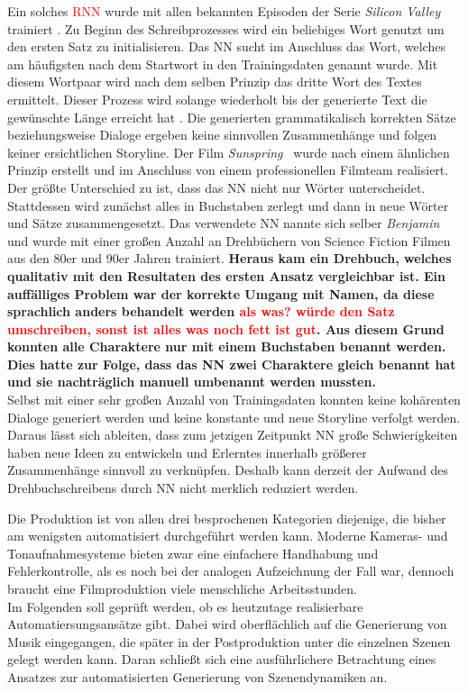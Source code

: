 \documentclass[times, 11pt,twocolumn]{article}
\begin{document}
 \label{sec:SOTAVorverarbeitung}
Ein solches \textcolor{red}{RNN} wurde mit allen bekannten Episoden der Serie \textit{Silicon Valley} trainiert \cite{DrehbuchSV}. Zu Beginn des Schreibprozesses wird ein beliebiges Wort genutzt um den ersten Satz zu initialisieren. Das NN sucht im Anschluss das Wort, welches am häufigsten nach dem Startwort in den Trainingsdaten genannt wurde. Mit diesem Wortpaar wird nach dem selben Prinzip das dritte Wort des Textes ermittelt. Dieser Prozess wird solange wiederholt bis der generierte Text die gewünschte Länge erreicht hat \cite{DrehbuchWrite}. Die generierten  grammatikalisch korrekten Sätze beziehungsweise Dialoge ergeben keine sinnvollen Zusammenhänge und folgen keiner ersichtlichen Storyline. Der Film \textit{Sunspring}~\cite{DrehbuchMovie} wurde nach einem ähnlichen Prinzip erstellt und im Anschluss von einem professionellen Filmteam realisiert. Der größte Unterschied zu \cite{DrehbuchSV} ist, dass das NN nicht nur Wörter unterscheidet. Stattdessen wird zunächst alles in Buchstaben zerlegt und dann in neue Wörter und Sätze zusammengesetzt. Das verwendete NN nannte sich selber \textit{Benjamin} und wurde mit einer großen Anzahl an Drehbüchern von Science Fiction Filmen aus den 80er und 90er Jahren trainiert. \textbf{Heraus kam ein Drehbuch, welches qualitativ  mit den Resultaten des ersten Ansatz vergleichbar ist. Ein auffälliges Problem war der korrekte Umgang mit Namen, da diese sprachlich anders behandelt werden \textcolor{red}{als was? würde den Satz umschreiben, sonst ist alles was noch fett ist gut}. Aus diesem Grund konnten alle Charaktere nur mit einem Buchstaben benannt werden. Dies hatte zur Folge, dass das NN zwei Charaktere gleich benannt hat und sie nachträglich manuell umbenannt werden mussten.}\\

Selbst mit einer sehr großen Anzahl von Trainingsdaten konnten keine kohärenten Dialoge generiert werden und keine konstante und neue Storyline verfolgt werden. Daraus lässt sich ableiten, dass zum jetzigen Zeitpunkt NN große Schwierigkeiten haben neue Ideen zu entwickeln und Erlerntes innerhalb größerer Zusammenhänge sinnvoll zu verknüpfen. Deshalb kann derzeit der Aufwand des Drehbuchschreibens durch NN nicht merklich reduziert werden.

 \label{sec:Produktion}
Die Produktion ist von allen drei besprochenen Kategorien diejenige, die bisher am wenigsten automatisiert durchgeführt werden kann. Moderne Kameras- und Tonaufnahmesysteme bieten zwar eine einfachere Handhabung und Fehlerkontrolle, als es noch bei der analogen Aufzeichnung der Fall war, dennoch braucht eine Filmproduktion viele menschliche Arbeitsstunden. \\
Im Folgenden soll geprüft werden, ob es heutzutage realisierbare Automatiersungsansätze gibt. Dabei wird oberflächlich auf die Generierung von Musik eingegangen, die später in der Postproduktion unter die einzelnen Szenen gelegt werden kann. Daran schließt sich eine ausführlichere Betrachtung eines Ansatzes zur automatisierten Generierung von Szenendynamiken an. 
\end{document}
